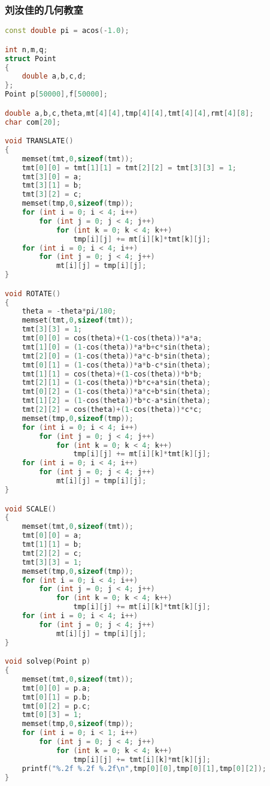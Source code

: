     \subsubsection{刘汝佳的几何教室}
	\begin{lstlisting}[language=c++]
const double pi = acos(-1.0);

int n,m,q;
struct Point
{
    double a,b,c,d;
};
Point p[50000],f[50000];

double a,b,c,theta,mt[4][4],tmp[4][4],tmt[4][4],rmt[4][8];
char com[20];

void TRANSLATE()
{
    memset(tmt,0,sizeof(tmt));
    tmt[0][0] = tmt[1][1] = tmt[2][2] = tmt[3][3] = 1;
    tmt[3][0] = a;
    tmt[3][1] = b;
    tmt[3][2] = c;
    memset(tmp,0,sizeof(tmp));
    for (int i = 0; i < 4; i++)
        for (int j = 0; j < 4; j++)
            for (int k = 0; k < 4; k++)
                tmp[i][j] += mt[i][k]*tmt[k][j];
    for (int i = 0; i < 4; i++)
        for (int j = 0; j < 4; j++)
            mt[i][j] = tmp[i][j];
}

void ROTATE()
{
    theta = -theta*pi/180;
    memset(tmt,0,sizeof(tmt));
    tmt[3][3] = 1;
    tmt[0][0] = cos(theta)+(1-cos(theta))*a*a;
    tmt[1][0] = (1-cos(theta))*a*b+c*sin(theta);
    tmt[2][0] = (1-cos(theta))*a*c-b*sin(theta);
    tmt[0][1] = (1-cos(theta))*a*b-c*sin(theta);
    tmt[1][1] = cos(theta)+(1-cos(theta))*b*b;
    tmt[2][1] = (1-cos(theta))*b*c+a*sin(theta);
    tmt[0][2] = (1-cos(theta))*a*c+b*sin(theta);
    tmt[1][2] = (1-cos(theta))*b*c-a*sin(theta);
    tmt[2][2] = cos(theta)+(1-cos(theta))*c*c;
    memset(tmp,0,sizeof(tmp));
    for (int i = 0; i < 4; i++)
        for (int j = 0; j < 4; j++)
            for (int k = 0; k < 4; k++)
                tmp[i][j] += mt[i][k]*tmt[k][j];
    for (int i = 0; i < 4; i++)
        for (int j = 0; j < 4; j++)
            mt[i][j] = tmp[i][j];
}

void SCALE()
{
    memset(tmt,0,sizeof(tmt));
    tmt[0][0] = a;
    tmt[1][1] = b;
    tmt[2][2] = c;
    tmt[3][3] = 1;
    memset(tmp,0,sizeof(tmp));
    for (int i = 0; i < 4; i++)
        for (int j = 0; j < 4; j++)
            for (int k = 0; k < 4; k++)
                tmp[i][j] += mt[i][k]*tmt[k][j];
    for (int i = 0; i < 4; i++)
        for (int j = 0; j < 4; j++)
            mt[i][j] = tmp[i][j];
}

void solvep(Point p)
{
    memset(tmt,0,sizeof(tmt));
    tmt[0][0] = p.a;
    tmt[0][1] = p.b;
    tmt[0][2] = p.c;
    tmt[0][3] = 1;
    memset(tmp,0,sizeof(tmp));
    for (int i = 0; i < 1; i++)
        for (int j = 0; j < 4; j++)
            for (int k = 0; k < 4; k++)
                tmp[i][j] += tmt[i][k]*mt[k][j];
    printf("%.2f %.2f %.2f\n",tmp[0][0],tmp[0][1],tmp[0][2]);
}


\end{lstlisting}

